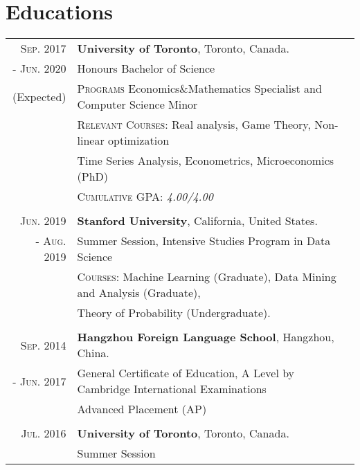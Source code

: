 \documentclass[a4paper,10pt]{article}
\begin{document}
\section{Educations}
\begin{tabular}{rl}

    \textsc{Sep.} 2017 & \textbf{University of Toronto}, Toronto, Canada. \\
    - \textsc{Jun.} 2020 & {Honours Bachelor of Science} \\
    (Expected)& \quad \textsc{Programs} Economics\&Mathematics Specialist and Computer Science Minor \\
    & \quad \textsc{Relevant Courses}:  Real analysis, Game Theory, Non-linear optimization\\
    & \quad Time Series Analysis, Econometrics, Microeconomics (PhD)\\
    & \quad \textsc{Cumulative GPA: } \emph{4.00/4.00}\\
    \\
    \textsc{Jun.} 2019 & \textbf{Stanford University}, California, United States. \\
    - \textsc{Aug.} 2019 & Summer Session, Intensive Studies Program in Data Science\\
    	& \quad \textsc{Courses:} Machine Learning (Graduate), Data Mining and Analysis (Graduate), \\
    	& \quad Theory of Probability (Undergraduate).\\
    \\
    \textsc{Sep.} 2014 & \textbf{Hangzhou Foreign Language School}, Hangzhou, China.\\
    - \textsc{Jun.} 2017 & {General Certificate of Education, A Level by Cambridge International Examinations} \\
    & Advanced Placement (AP) \\
   	\\
    \textsc{Jul.} 2016 & \textbf{University of Toronto}, Toronto, Canada. \\
    & Summer Session

\end{tabular}
\end{document}
